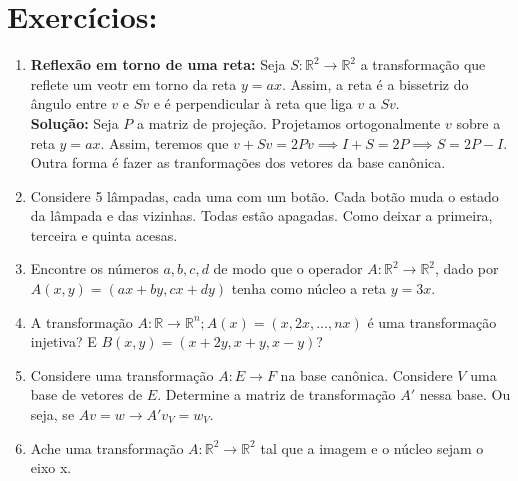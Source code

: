 \documentclass[12pt,letterpaper]{article}
\begin{document}
\section*{Exercícios:}

\begin{enumerate}
    \item \textbf{Reflexão em torno de uma reta:} Seja $S: \mathbb{R}^2 \to \mathbb{R}^2$ a transformação que reflete um veotr em torno da reta $y = ax$. Assim, a reta é a bissetriz do ângulo entre $v$ e $Sv$ e é perpendicular à reta que liga $v$ a $Sv$.
    \\
    \textbf{Solução: } Seja $P$ a matriz de projeção. Projetamos ortogonalmente $v$ sobre a reta $y = ax$. Assim, teremos que $v + Sv = 2Pv \implies I + S = 2P \implies S = 2P - I$. Outra forma é fazer as tranformações dos vetores da base canônica. 
    
    \item Considere 5 lâmpadas, cada uma com um botão. Cada botão muda o estado da lâmpada e das vizinhas. Todas estão apagadas. Como deixar a primeira, terceira e quinta acesas. 
 
    \item Encontre os números $a,b,c,d$ de modo que o operador $A: \mathbb{R}^2 \to \mathbb{R}^2$, dado por $A(x,y) = (ax + by, cx + dy)$ tenha como núcleo a reta $y = 3x$. 
    
    \item A transformação $A: \mathbb{R} \to \mathbb{R}^n; A(x) = (x,2x,...,nx)$ é uma transformação injetiva? E $B(x,y) = (x + 2y, x + y, x - y)$?  
    
    \item Considere uma transformação $A: E \to F$ na base canônica. Considere $V$ uma base de vetores de $E$. Determine a matriz de transformação $A'$ nessa base. Ou seja, se $Av = w \to A'v_V = w_V$. 
    \item Ache uma transformação $A: \mathbb{R}^2 \to \mathbb{R}^2$ tal que a imagem e o núcleo sejam o eixo x.
\end{enumerate}
\end{document}
